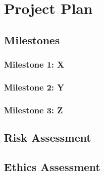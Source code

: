 \section{Project Plan}

\subsection{Milestones}

\subsubsection{Milestone 1: X}
\lipsum[62]

\subsubsection{Milestone 2: Y}
\lipsum[63]

\subsubsection{Milestone 3: Z}
\lipsum[64]

\subsection{Risk Assessment}
\lipsum[65-66]

\subsection{Ethics Assessment}
\lipsum[67-68]